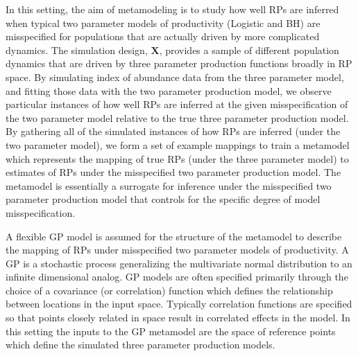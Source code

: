 %
In this setting, the aim of metamodeling is to study how well RPs are inferred 
when typical two parameter models of productivity (Logistic and BH) are 
misspecified for populations that are actually driven by more complicated 
dynamics. The simulation design, $\bm{X}$, provides a sample of different 
population dynamics that are driven by three parameter production functions 
broadly in RP space. By simulating index of abundance data from the three 
parameter model, and fitting those data with the two parameter production model, we %
observe particular instances of how well RPs are inferred at the given 
misspecification of the two parameter model relative to the true three parameter 
production model. By gathering all of the simulated instances of how RPs are 
inferred (under the two parameter model), %
we form a set of example mappings to train a metamodel which represents the 
mapping of true RPs (under the three parameter model) to estimates of RPs under the 
misspecified two parameter production model. The metamodel is essentially a surrogate 
for inference under the misspecified two parameter production model that 
controls for the specific degree of model misspecification. 

%
A flexible GP model is assumed for the structure of the metamodel to describe the mapping 
of RPs under misspecified two parameter models of productivity. A GP is a 
stochastic process generalizing the multivariate normal distribution
to an infinite dimensional analog. GP models are often specified primarily 
through the choice of a covariance (or correlation) function which defines the 
relationship between locations in the input space. %
Typically correlation functions are specified so that points closely related in 
space result in correlated effects in the model. In this setting the inputs to 
the GP metamodel are the space of reference points which define the simulated 
three parameter production models. 


